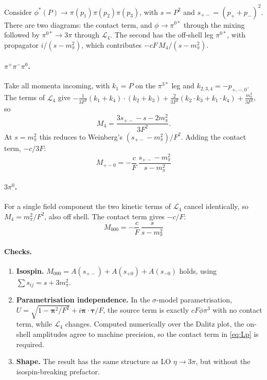 \documentclass{article}
\newcommand{\spm}{s_{+-}}
\newcommand{\mpi}{m_\pi}
\begin{document}
Consider $\phi^*(P)\to\pi(p_1)\pi(p_2)\pi(p_3)$, with $s=P^2$ and $\spm=(p_++p_-)^2$. There are
two diagrams: the contact term, and $\phi\to\pi^{0*}$ through the mixing followed by
$\pi^{0*}\to3\pi$ through $\mathcal L_4$. The second has the off-shell leg $\pi^{0*}$, with
propagator $i/(s-\mpi^2)$, which contributes $-cF\,M_4/(s-\mpi^2)$.

\paragraph{$\pi^+\pi^-\pi^0$.}
Take all momenta incoming, with $k_1=P$ on the $\pi^{3*}$ leg and $k_{2,3,4}=-p_{+,-,0}$.
The terms of $\mathcal L_4$ give
$-\tfrac{1}{3F^2}(k_1+k_4)\!\cdot\!(k_2+k_3)
 +\tfrac{2}{3F^2}(k_2\!\cdot\!k_3+k_1\!\cdot\!k_4)+\tfrac{\mpi^2}{3F^2}$, so
\begin{equation}
  M_4=\frac{3\spm-s-2\mpi^2}{3F^2}.
\end{equation}
At $s=\mpi^2$ this reduces to Weinberg's $(\spm-\mpi^2)/F^2$. Adding the contact term, $-c/3F$:
\begin{equation}
  \boxed{\,M_{+-0}=-\frac{c}{F}\,\frac{\spm-\mpi^2}{s-\mpi^2}\,}
\end{equation}

\paragraph{$3\pi^0$.}
For a single field component the two kinetic terms of $\mathcal L_4$ cancel identically, so
$M_4=\mpi^2/F^2$, also off shell. The contact term gives $-c/F$:
\begin{equation}
  \boxed{\,M_{000}=-\frac{c}{F}\,\frac{s}{s-\mpi^2}\,}
\end{equation}

\paragraph{Checks.}
\begin{enumerate}
\item \textbf{Isospin.} $M_{000}=A(s_{+-})+A(s_{+0})+A(s_{-0})$ holds, using $\sum s_{ij}=s+3\mpi^2$.
\item \textbf{Parametrisation independence.} In the $\sigma$-model parametrisation,
  $U=\sqrt{1-\boldsymbol\pi^2/F^2}+i\boldsymbol\pi\cdot\boldsymbol\tau/F$, the source term is
  exactly $cF\phi\pi^3$ with no contact term, while $\mathcal L_4$ changes. Computed numerically
  over the Dalitz plot, the on-shell amplitudes agree to machine precision, so the contact term in
  \eqref{eq:Lp} is required.
\item \textbf{Shape.} The result has the same structure as LO $\eta\to3\pi$, but without the
  isospin-breaking prefactor.
\end{enumerate}
\end{document}
